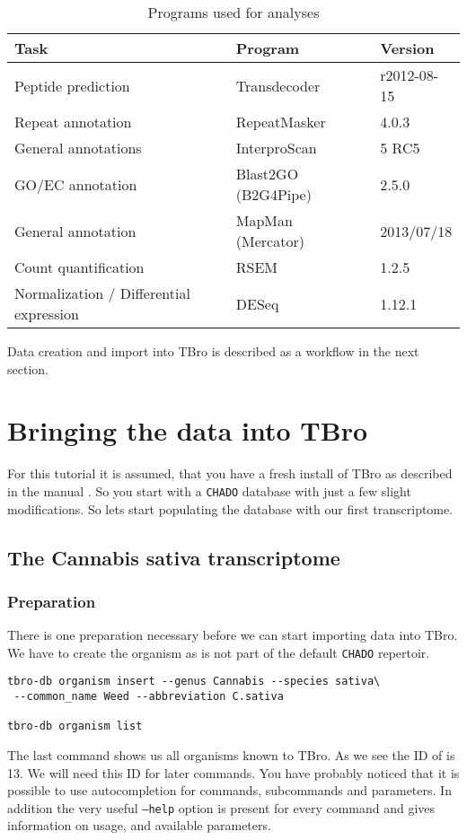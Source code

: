\documentclass[english]{scrartcl}
\begin{document}
\begin{table}
\caption{Programs used for analyses}
\label{tab:PROGRAMS}
\begin{tabularx}{\textwidth}{Xll}
\toprule
Task & Program & Version\\
\midrule
Peptide prediction & Transdecoder & r2012-08-15\\
Repeat annotation & RepeatMasker & 4.0.3 \\
General annotations & InterproScan & 5 RC5\\
GO/EC annotation & Blast2GO (B2G4Pipe) & 2.5.0\\
General annotation & MapMan (Mercator) & 2013/07/18\\
Count quantification & RSEM & 1.2.5 \\
Normalization / Differential expression & DESeq & 1.12.1 \\
\bottomrule
\end{tabularx}
\end{table}

Data creation and import into TBro is described as a workflow in the next
section.


\section{Bringing the data into TBro}

For this tutorial it is assumed, that you have a fresh install of
TBro as described in the manual \cite{DIP_TBRO}. So you start with a \texttt{CHADO}
database with just a few slight modifications. So lets start populating
the database with our first transcriptome.

\subsection{The Cannabis sativa transcriptome}
\subsubsection{Preparation}
There is one preparation necessary before we can start importing data into TBro.
We have to create the organism as  is not part of the default
\texttt{CHADO} repertoir.
\begin{lstlisting}[style=Bash]
tbro-db organism insert --genus Cannabis --species sativa\
 --common_name Weed --abbreviation C.sativa
 
tbro-db organism list
\end{lstlisting} 
The last command shows us all organisms known to TBro. As we see the ID of
\plant{CS} is 13. We will need this ID for later commands.
You have probably noticed that it is possible to use autocompletion for
commands, subcommands and parameters. In addition the very useful
\texttt{--help} option is present for every command and gives information on
usage, and available parameters.
\end{document}
